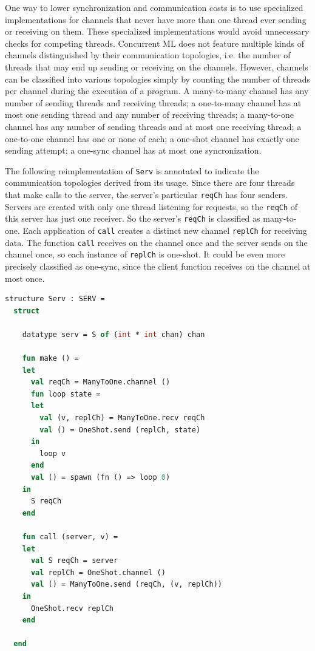 \documentclass[letterpaper, 11pt]{extarticle}
\begin{document}
One way to lower synchronization and communication costs is to use specialized implementations
for channels that never have more than one thread ever sending or receiving on them. These
specialized implementations would avoid unnecessary checks for competing threads.
Concurrent ML does not feature multiple kinds of channels distinguished by their communication
topologies, i.e. the number of threads that may end up sending or receiving on the channels.
However, channels can be classified into various topologies simply by counting the number of
threads per channel during the execution of a program. A many-to-many channel has any number
of sending threads and receiving threads;
a one-to-many channel has at most one sending thread and
any number of receiving threads;
a many-to-one channel has any number of sending threads and at most one receiving thread;
a one-to-one channel has one or none of each;
a one-shot channel has exactly one sending attempt;
a one-sync channel has at most one syncronization.

The following reimplementation of \lstinline{Serv} is annotated to indicate the communication topologies
derived from its usage. Since there are four threads that make calls to the server, the
server's particular \lstinline{reqCh} has four senders. Servers are created with only one
thread listening for requests, so the \lstinline{reqCh} of this server has just one receiver.
So the server's \lstinline{reqCh} is classified as many-to-one.
Each application of \lstinline{call} creates a distinct
new channel \lstinline{replCh} for receiving data. The function \lstinline{call} receives on the channel
once and the server sends on the channel once, so each instance of \lstinline{replCh} is
one-shot. It could be even more precisely classified as one-sync, since the client function receives on
the channel at most once.

\begin{lstlisting}[language=ML, mathescape]
  structure Serv : SERV =
  struct 

    datatype serv = S of (int * int chan) chan 

    fun make () =
    let 
      val reqCh = ManyToOne.channel ()
      fun loop state =
      let
        val (v, replCh) = ManyToOne.recv reqCh
        val () = OneShot.send (replCh, state)
      in
        loop v
      end
      val () = spawn (fn () => loop 0)
    in
      S reqCh
    end 

    fun call (server, v) =
    let 
      val S reqCh = server
      val replCh = OneShot.channel ()
      val () = ManyToOne.send (reqCh, (v, replCh))
    in
      OneShot.recv replCh
    end

  end
\end{lstlisting}
\end{document}
